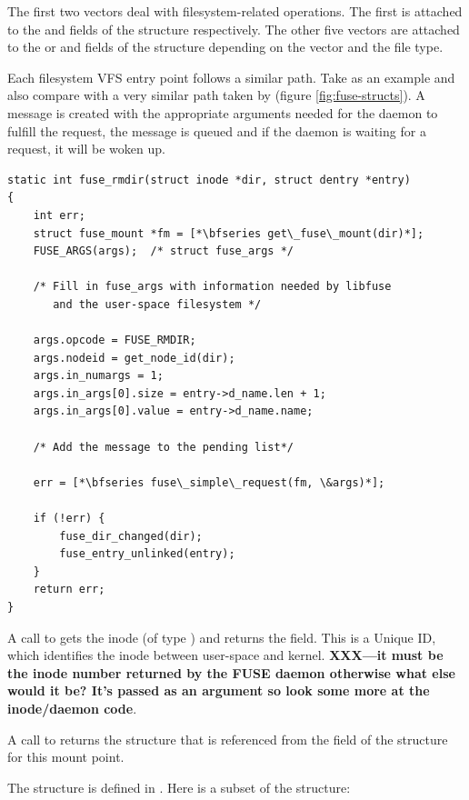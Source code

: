 \noindent
The first two vectors deal with filesystem-related operations. The first is attached to the  and  fields of the  structure respectively. The other five vectors are attached to the  or  and  fields of the  structure depending on the vector and the file type.

Each  filesystem VFS entry point follows a similar path. Take  as an example and also compare with a very similar path taken by  (figure \ref{fig:fuse-structs}). A message is created with the appropriate arguments needed for the  daemon to fulfill the request, the message is queued and if the daemon is waiting for a request, it will be woken up.

\begin{lstlisting}
static int fuse_rmdir(struct inode *dir, struct dentry *entry)
{
    int err;
    struct fuse_mount *fm = [*\bfseries get\_fuse\_mount(dir)*];
    FUSE_ARGS(args);  /* struct fuse_args */

    /* Fill in fuse_args with information needed by libfuse 
       and the user-space filesystem */
    
    args.opcode = FUSE_RMDIR;
    args.nodeid = get_node_id(dir);
    args.in_numargs = 1;
    args.in_args[0].size = entry->d_name.len + 1;
    args.in_args[0].value = entry->d_name.name;
    
    /* Add the message to the pending list*/
    
    err = [*\bfseries fuse\_simple\_request(fm, \&args)*];

    if (!err) {
        fuse_dir_changed(dir);
        fuse_entry_unlinked(entry);
    }
    return err;
}
\end{lstlisting}

\noindent
A call to  gets the  inode (of type ) and returns the  field. This is a Unique ID, which identifies the inode between user-space and kernel. \textbf{XXX---it must be the inode number returned by the FUSE daemon otherwise what else would it be? It's passed as an argument so look some more at the inode/daemon code}.

A call to  returns the  structure that is referenced from the  field of the  structure for this mount point. 

The  structure is defined in . Here is a subset of the structure:

